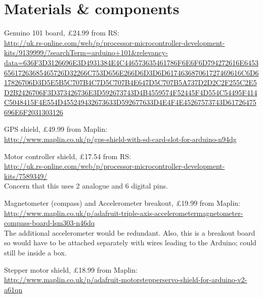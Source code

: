 \documentclass[a4paper,11pt,twoside,class=meetingmins,crop=false]{standalone}
\begin{document}

\maketitle

\section{Materials \& components}
\begin{items}
    \item Genuino 101 board, \pounds{24.99} from RS:\\ \url{http://uk.rs-online.com/web/p/processor-microcontroller-development-kits/9139999/?searchTerm=arduino+101&relevancy-data=636F3D3126696E3D4931384E4C446573635461786F6E6F6D794272616E645365617263685465726D32266C753D656E266D6D3D6D617463687061727469616C6D617826706D3D5E5B5C707B4C7D5C707B4E647D5C707B5A737D2D2C2F255C2E5D2B2426706F3D373426736E3D592673743D4B4559574F52445F4D554C54495F414C5048415F4E554D455249432673633D592677633D4E4F4E45267573743D61726475696E6F2031303126}
    \item GPS shield, \pounds{49.99} from Maplin:\\ \url{http://www.maplin.co.uk/p/gps-shield-with-sd-card-slot-for-arduino-n94dg}
    \item Motor controller shield, \pounds{17.54} from RS:\\ \url{http://uk.rs-online.com/web/p/processor-microcontroller-development-kits/7589349/}\\
    Concern that this uses 2 analogue and 6 digital pins.
    \item Magnetometer (compass) and Accelerometer breakout, \pounds{19.99} from Maplin:\\ \url{http://www.maplin.co.uk/p/adafruit-triple-axis-accelerometermagnetometer-compass-board-lsm303-n46dq}\\
    The additional accelerometer would be redundant. Also, this is a breakout board so would have to be attached separately with wires leading to the Arduino; could still be inside a box.
    \item Stepper motor shield, \pounds{18.99} from Maplin:\\ \url{http://www.maplin.co.uk/p/adafruit-motorstepperservo-shield-for-arduino-v2-a61qn}

\end{items}
\end{document}
